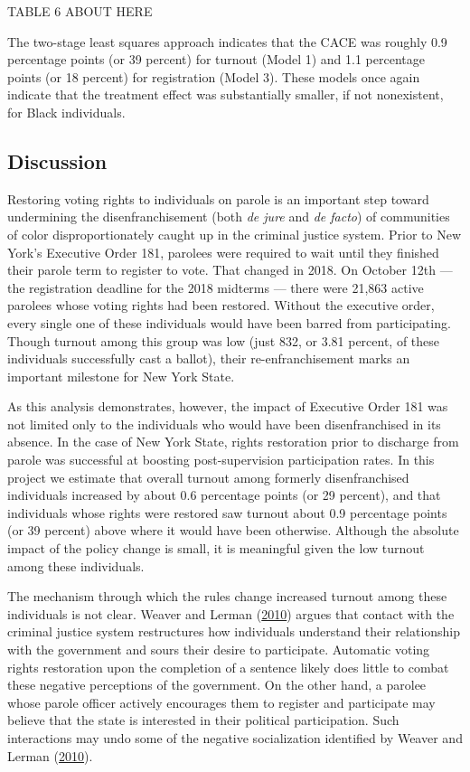 \documentclass[
  12pt,
]{article}
\begin{document}
TABLE 6 ABOUT HERE

The two-stage least squares approach indicates that the CACE was roughly 0.9 percentage points (or 39 percent) for turnout (Model 1) and 1.1 percentage points (or 18 percent) for registration (Model 3). These models once again indicate that the treatment effect was substantially smaller, if not nonexistent, for Black individuals.

\hypertarget{discussion}{%
\subsection*{Discussion}\label{discussion}}

Restoring voting rights to individuals on parole is an important step toward undermining the disenfranchisement (both \emph{de jure} and \emph{de facto}) of communities of color disproportionately caught up in the criminal justice system. Prior to New York's Executive Order 181, parolees were required to wait until they finished their parole term to register to vote. That changed in 2018. On October 12th --- the registration deadline for the 2018 midterms --- there were 21,863 active parolees whose voting rights had been restored. Without the executive order, every single one of these individuals would have been barred from participating. Though turnout among this group was low (just 832, or 3.81 percent, of these individuals successfully cast a ballot), their re-enfranchisement marks an important milestone for New York State.

As this analysis demonstrates, however, the impact of Executive Order 181 was not limited only to the individuals who would have been disenfranchised in its absence. In the case of New York State, rights restoration prior to discharge from parole was successful at boosting post-supervision participation rates. In this project we estimate that overall turnout among formerly disenfranchised individuals increased by about 0.6 percentage points (or 29 percent), and that individuals whose rights were restored saw turnout about 0.9 percentage points (or 39 percent) above where it would have been otherwise. Although the absolute impact of the policy change is small, it is meaningful given the low turnout among these individuals.

The mechanism through which the rules change increased turnout among these individuals is not clear. Weaver and Lerman (\protect\hyperlink{ref-Weaver2010}{2010}) argues that contact with the criminal justice system restructures how individuals understand their relationship with the government and sours their desire to participate. Automatic voting rights restoration upon the completion of a sentence likely does little to combat these negative perceptions of the government. On the other hand, a parolee whose parole officer actively encourages them to register and participate may believe that the state is interested in their political participation. Such interactions may undo some of the negative socialization identified by Weaver and Lerman (\protect\hyperlink{ref-Weaver2010}{2010}).
\end{document}

